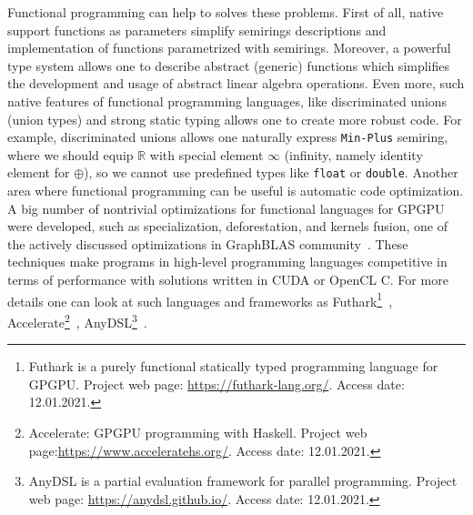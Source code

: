 Functional programming can help to solves these problems.
First of all, native support functions as parameters simplify semirings descriptions and implementation of functions parametrized with semirings. 
Moreover, a powerful type system allows one to describe abstract (generic) functions which simplifies the development and usage of abstract linear algebra operations. 
Even more, such native features of functional programming languages, like discriminated unions (union types) and strong static typing allows one to create more robust code.
For example, discriminated unions allows one naturally express \texttt{Min-Plus} semiring, where we should equip $\mathbb{R}$ with special element $\infty$ (infinity, namely identity element for $\oplus$), so we cannot use predefined types like \texttt{float} or \texttt{double}.
Another area where functional programming can be useful is automatic code optimization.
A big number of nontrivial optimizations for functional languages for GPGPU were developed, such as specialization, deforestation, and kernels fusion, one of the actively discussed optimizations in GraphBLAS community~\cite{yang2019graphblast}.
These techniques make programs in high-level programming languages competitive in terms of performance with solutions written in CUDA or OpenCL C. 
For more details one can look at such languages and frameworks as Futhark\footnote{Futhark is a purely functional statically typed programming language for GPGPU. Project web page: \url{https://futhark-lang.org/}. Access date: 12.01.2021.}~\cite{Henriksen:2017:FPF:3062341.3062354}, Accelerate\footnote{Accelerate: GPGPU programming with Haskell. Project web page:\url{https://www.acceleratehs.org/}. Access date: 12.01.2021.}~\cite{10.1145/2544174.2500595}, AnyDSL\footnote{AnyDSL is a partial evaluation framework for parallel programming. Project web page: \url{https://anydsl.github.io/}. Access date: 12.01.2021.}~\cite{10.1145/3276489}.

